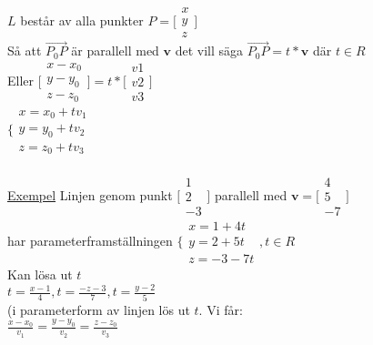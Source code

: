 \documentclass{article}
\begin{document}
\(L\) består av alla punkter \(P = \bigl[\begin{smallmatrix}
x \\ y \\ z
\end{smallmatrix} \bigr] \)\\
Så att \(\vec{P_0 P} \) är parallell med \(\mathbf{v}\) det vill säga \(\vec{P_0 P} = t * \mathbf{v} \) där \(t \in R \)\\
Eller \(\bigl[\begin{smallmatrix}
x - x_0 \\ y - y_0 \\ z - z_0
\end{smallmatrix} \bigr] = t * \bigl[\begin{smallmatrix}
v1 \\ v2 \\ v3
\end{smallmatrix} \bigr] \)\\
\(\bigl\{\begin{smallmatrix}
x = x_0 + tv_1 \\ y = y_0 + tv_2 \\ z = z_0 + tv_3
\end{smallmatrix} \)\\
\\
\underline{Exempel} Linjen genom punkt \(\bigl[\begin{smallmatrix}
1 \\ 2 \\ -3
\end{smallmatrix} \bigr] \) parallell med \(\mathbf{v} = \bigl[\begin{smallmatrix}
4 \\ 5 \\ -7
\end{smallmatrix} \bigr] \) \\
har parameterframställningen \(\bigl\{\begin{smallmatrix}
x = 1 + 4t \\ y = 2 + 5t \\ z = -3 - 7t
\end{smallmatrix}, t \in R\)\\
Kan lösa ut \(t\)\\
\(t = \frac{x - 1}{4}, t = \frac{-z - 3}{7}, t = \frac{y - 2}{5} \)\\
(i parameterform av linjen lös ut \(t\). Vi får: \\
\(\frac{x - x_0}{v_1} = \frac{y - y_0}{v_2} = \frac{z - z_0}{v_3} \)
\\
\end{document}
